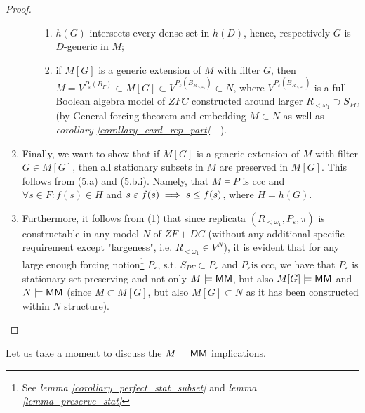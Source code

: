 \begin{proof}
\begin{enumerate}
\begin{enumerate}
\begin{enumerate}[label=(\roman*)]
                    \item $h(G)$ intersects every dense set in $h(D)$, hence, respectively $G$ is $D$-generic in $M$;
                    \item if $M[G]$ is a generic extension of $M$ with filter $G$, then $M = V^{P_\varepsilon(B_F)} \subset M[G] \subset V^{P_\varepsilon(B_{R_{<\omega_1}})} \subset N$, where $V^{P_\varepsilon(B_{R_{<\omega_1}})}$ is a full Boolean algebra model of $ZFC$ constructed around larger $R_{<\omega_1} \supset S_{FC}$ (by General forcing theorem and embedding $M \subset N$ as well as \textit{corollary \ref{corollary_card_rep_part} - }).
                \end{enumerate}

        \end{enumerate}
        \item Finally, we want to show that if $M[G]$ is a generic extension of $M$ with filter $G \in M[G]$, then all stationary subsets in $M$ are preserved in $M[G]$.  This follows from (5.a) and (5.b.i). Namely, that  $M \models P \text{ is ccc}$ and  $\forall s \in F: f(s) \in H$ and $s \ \varepsilon\  f(s) \implies s \leq f(s)$, where $H = h(G)$.
        
        \item Furthermore, it follows from (1) that since replicata $(R_{<\omega_1}, P_\varepsilon, \pi)$ is constructable in any model $N$ of $ZF + DC$ (without any additional specific requirement except "largeness", i.e. $R_{<\omega_1} \in V^N$), it is evident that for any large enough forcing notion\footnote{See \textit{lemma \ref{corollary_perfect_stat_subset}} and \textit{lemma \ref{lemma_preserve_stat}}} $P_\varepsilon$, s.t. $S_{PF} \subset P_\varepsilon$ and $P_\varepsilon \text{is ccc}$, we have that $P_\varepsilon$ is stationary set preserving and not only $M \models {\sf MM}$, but also $M[G] \models {\sf MM} $ and $N \models {\sf MM} $ (since $M \subset M[G]$, but also $M[G] \subset N$ as it has been constructed within $N$ structure).
    \end{enumerate}
\end{proof}


Let us take a moment to discuss the $M \models {\sf MM}$ implications.

